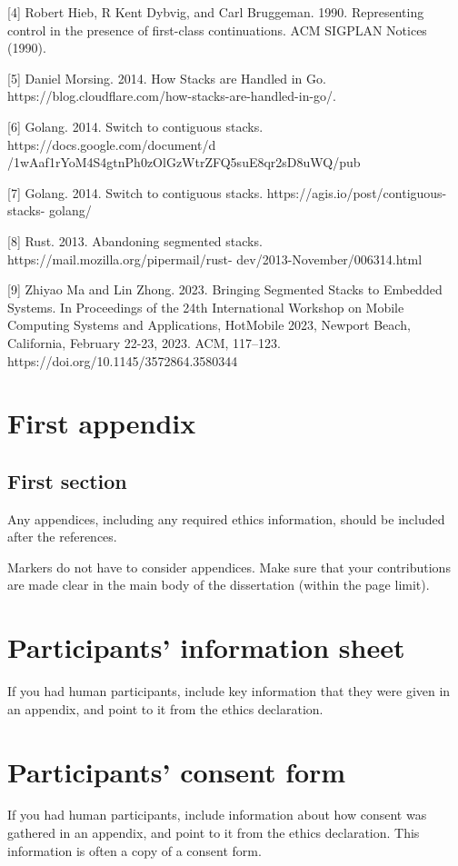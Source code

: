 \documentclass[logo,bsc,singlespacing,parskip]{infthesis}
\begin{document}
[4] Robert Hieb, R Kent Dybvig, and Carl Bruggeman. 1990. Representing control in
the presence of first-class continuations. ACM SIGPLAN Notices (1990).

[5] Daniel Morsing. 2014. How Stacks are Handled in Go. https://blog.cloudflare.com/how-stacks-are-handled-in-go/.

[6] Golang. 2014. Switch to contiguous stacks. https://docs.google.com/document/d
/1wAaf1rYoM4S4gtnPh0zOlGzWtrZFQ5suE8qr2sD8uWQ/pub

[7] Golang. 2014. Switch to contiguous stacks. https://agis.io/post/contiguous-stacks-
golang/

[8] Rust. 2013. Abandoning segmented stacks. https://mail.mozilla.org/pipermail/rust-
dev/2013-November/006314.html

[9] Zhiyao Ma and Lin Zhong. 2023. Bringing Segmented Stacks to Embedded Systems. In Proceedings of the 24th
International Workshop on Mobile Computing Systems and Applications, HotMobile 2023, Newport Beach, California,
February 22-23, 2023. ACM, 117–123. https://doi.org/10.1145/3572864.3580344







\appendix

\chapter{First appendix}

\section{First section}

Any appendices, including any required ethics information, should be included
after the references.

Markers do not have to consider appendices. Make sure that your contributions
are made clear in the main body of the dissertation (within the page limit).

\chapter{Participants' information sheet}

If you had human participants, include key information that they were given in
an appendix, and point to it from the ethics declaration.

\chapter{Participants' consent form}

If you had human participants, include information about how consent was
gathered in an appendix, and point to it from the ethics declaration.
This information is often a copy of a consent form.
\end{document}
